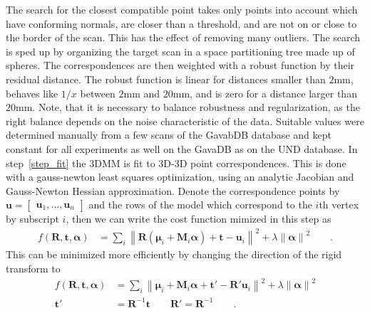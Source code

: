 \documentclass[10pt,twocolumn,letterpaper]{article}
\newcommand{\Matrix}[1]{\begin{bmatrix} #1 \end{bmatrix}}
\newcommand*{\MAT}[1]  {\ensuremath{\mathbf{#1}}}
\newcommand*{\VEC}[1]  {\ensuremath{\bm{#1}}}
\newcommand*{\normLR}[1]{\left\| #1 \right\|}%
\begin{document}
The search for the closest compatible point takes only points into account which
have conforming normals, are closer than a threshold, and are not on or close
to the border of the scan. This has the effect of removing many outliers.  The
search is sped up by organizing the target scan in a space partitioning tree
made up of spheres.
The correspondences are then weighted with a robust function by their
residual distance. The robust function is linear for distances smaller than
$2$mm, behaves like $1/x$ between $2$mm and
$20$mm, and is zero for a distance larger than $20$mm.
Note, that it is necessary to balance robustness and regularization, as the
right balance depends on the noise characteristic of the data. Suitable values
were determined manually from a few scans of the GavabDB database and kept
constant for all experiments as well on the GavaDB as on the UND database.  In
step~\ref{step_fit} the 3DMM is fit to 3D-3D point correspondences.  This is
done with a gauss-newton least squares optimization, using an analytic Jacobian
and Gauss-Newton Hessian approximation.  Denote the correspondence points by
$\MAT u=\Matrix{\VEC u_1, \dots, \VEC u_n}$ and the rows of the model which
correspond to the $i$th vertex by subscript $i$, then we can write the cost
function mimized in this step as
\begin{align}
  f(\MAT R, \VEC t, \VEC\alpha) &= \sum_i \normLR{\MAT R( \VEC\mu_i + \MAT M_i\VEC\alpha) + \VEC t - \VEC u_i}^2 + \lambda\normLR{\VEC\alpha}^2\qquad.\label{eqn:mincost}
\end{align}
This can be minimized more efficiently by changing the direction of the rigid transform to
\begin{align}
  f(\MAT R, \VEC t, \VEC\alpha) &= \sum_i \normLR{ \VEC\mu_i + \MAT M_i\VEC\alpha + {\VEC t'} - {\MAT R'}\VEC u_i }^2 + \lambda\normLR{\VEC\alpha}^2\nonumber\\
  {\VEC t'} &= \MAT R^{-1}\VEC t\qquad {\MAT R'} = \MAT R^{-1}\qquad.
\end{align}
\end{document}
